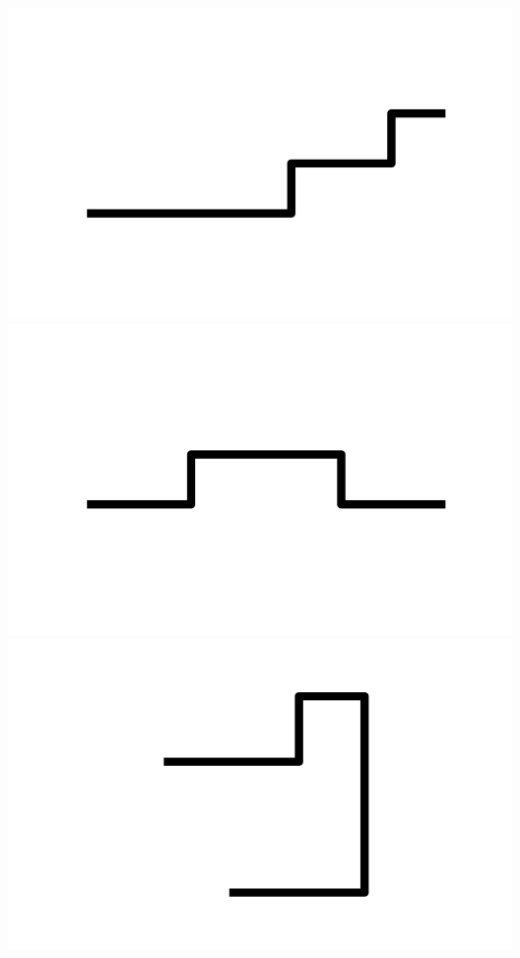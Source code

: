 \documentclass[]{report}
\begin{document}
\includegraphics[scale=.1]{pictures/21/state_cluster_shapes_484.pdf} 
\includegraphics[scale=.1]{pictures/21/state_cluster_shapes_485.pdf} 
\includegraphics[scale=.1]{pictures/21/state_cluster_shapes_486.pdf} 
\end{document}
